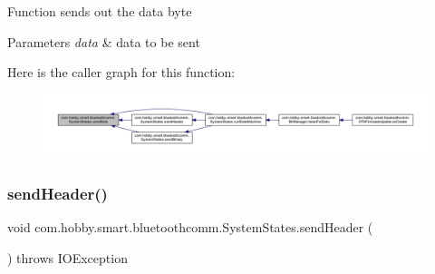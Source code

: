 Function sends out the data byte 
\begin{DoxyParams}{Parameters}
{\em data} & data to be sent \\
\hline
\end{DoxyParams}
Here is the caller graph for this function\+:\nopagebreak
\begin{figure}[H]
\begin{center}
\leavevmode
\includegraphics[width=350pt]{classcom_1_1hobby_1_1smart_1_1bluetoothcomm_1_1_system_states_a2fb76b16d2f0857f8951c93d38c8e9b8_icgraph}
\end{center}
\end{figure}
\mbox{\label{classcom_1_1hobby_1_1smart_1_1bluetoothcomm_1_1_system_states_ad7e78c660a16bba26735f2e2bb68599a}} 
\subsubsection{\texorpdfstring{send\+Header()}{sendHeader()}}
{\footnotesize\ttfamily void com.\+hobby.\+smart.\+bluetoothcomm.\+System\+States.\+send\+Header (\begin{DoxyParamCaption}{ }\end{DoxyParamCaption}) throws I\+O\+Exception}

